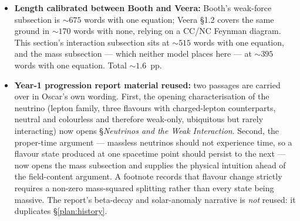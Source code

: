 \documentclass[11pt]{article}
\begin{document}
\begin{itemize}
    now internal to the physics: flavour is a label attached by the weak interaction rather than
    a property of a freely propagating neutrino, a distinction that is empty for massless
    neutrinos and is exactly what \S\ref{plan:oscillations} turns on. This also plants the
    flavour-versus-mass-eigenstate distinction one section before it is needed.
    \item[$\checkmark$] \textbf{Length calibrated between Booth and Veera:} Booth's weak-force
    subsection is $\sim 675$ words with one equation; Veera \S1.2 covers the same ground in
    $\sim 170$ words with none, relying on a CC/NC Feynman diagram. This section's interaction
    subsection sits at $\sim 515$ words with one equation, and the mass subsection --- which
    neither model places here --- at $\sim 395$ words with one equation. Total $\sim 1.6$~pp.
    \item[$\checkmark$] \textbf{Year-1 progression report material reused:} two passages are
    carried over in Oscar's own wording. First, the opening characterisation of the neutrino
    (lepton family, three flavours with charged-lepton counterparts, neutral and colourless
    and therefore weak-only, ubiquitous but rarely interacting) now opens
    \S\emph{Neutrinos and the Weak Interaction}. Second, the proper-time argument --- massless
    neutrinos should not experience time, so a flavour state produced at one spacetime point
    should persist to the next --- now opens the mass subsection and supplies the physical
    intuition ahead of the field-content argument. A footnote records that flavour change
    strictly requires a non-zero mass-squared splitting rather than every state being massive.
    The report's beta-decay and solar-anomaly narrative is \emph{not} reused: it duplicates
    \S\ref{plan:history}.
\end{itemize}
\end{document}
